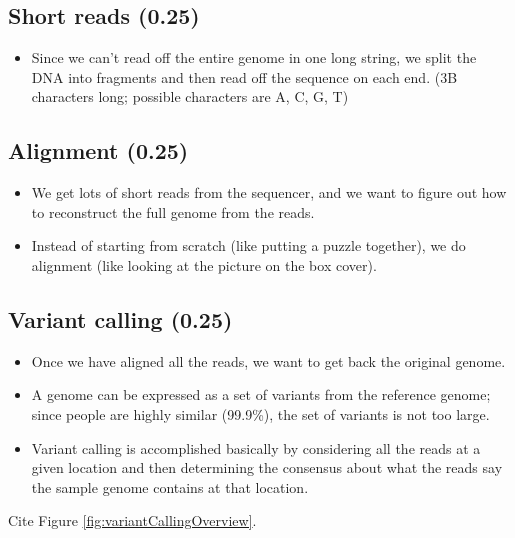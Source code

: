 \documentclass[10pt, conference, compsocconf]{IEEEtran}
\begin{document}
\subsection{Short reads (0.25)}
\begin{itemize}
\item{Since we can't read off the entire genome in one long string, we split the DNA into fragments and then read off the sequence on each end.  (3B characters long; possible characters are A, C, G, T)}
\end{itemize}
\subsection{Alignment (0.25)}
\begin{itemize}
\item{We get lots of short reads from the sequencer, and we want to figure out how to reconstruct the full genome from the reads.}
\item{Instead of starting from scratch (like putting a puzzle together), we do alignment (like looking at the picture on the box cover).}
\end{itemize}
\subsection{Variant calling (0.25)}
\begin{itemize}
\item{Once we have aligned all the reads, we want to get back the original genome.}
\item{A genome can be expressed as a set of variants from the reference genome; since people are highly similar (99.9\%), the set of variants is not too large.}
\item{Variant calling is accomplished basically by considering all the reads at a given location and then determining the consensus about what the reads say the sample genome contains at that location.}
\end{itemize}
Cite Figure \ref{fig:variantCallingOverview}.
\end{document}

